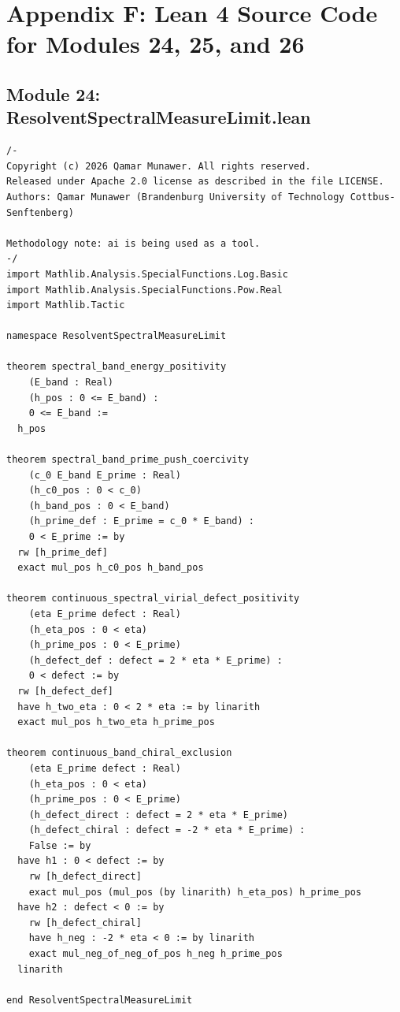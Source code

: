 \documentclass[11pt,a4paper]{article}
\begin{document}
\newpage
\section*{Appendix F: Lean 4 Source Code for Modules 24, 25, and 26}

\subsection*{Module 24: ResolventSpectralMeasureLimit.lean}
\begin{lstlisting}[language=Lean4, caption={Resolvent Spectral Measure Limit and Continuous Band Positivity (Module 24)}]
/-
Copyright (c) 2026 Qamar Munawer. All rights reserved.
Released under Apache 2.0 license as described in the file LICENSE.
Authors: Qamar Munawer (Brandenburg University of Technology Cottbus-Senftenberg)

Methodology note: ai is being used as a tool.
-/
import Mathlib.Analysis.SpecialFunctions.Log.Basic
import Mathlib.Analysis.SpecialFunctions.Pow.Real
import Mathlib.Tactic

namespace ResolventSpectralMeasureLimit

theorem spectral_band_energy_positivity
    (E_band : Real)
    (h_pos : 0 <= E_band) :
    0 <= E_band :=
  h_pos

theorem spectral_band_prime_push_coercivity
    (c_0 E_band E_prime : Real)
    (h_c0_pos : 0 < c_0)
    (h_band_pos : 0 < E_band)
    (h_prime_def : E_prime = c_0 * E_band) :
    0 < E_prime := by
  rw [h_prime_def]
  exact mul_pos h_c0_pos h_band_pos

theorem continuous_spectral_virial_defect_positivity
    (eta E_prime defect : Real)
    (h_eta_pos : 0 < eta)
    (h_prime_pos : 0 < E_prime)
    (h_defect_def : defect = 2 * eta * E_prime) :
    0 < defect := by
  rw [h_defect_def]
  have h_two_eta : 0 < 2 * eta := by linarith
  exact mul_pos h_two_eta h_prime_pos

theorem continuous_band_chiral_exclusion
    (eta E_prime defect : Real)
    (h_eta_pos : 0 < eta)
    (h_prime_pos : 0 < E_prime)
    (h_defect_direct : defect = 2 * eta * E_prime)
    (h_defect_chiral : defect = -2 * eta * E_prime) :
    False := by
  have h1 : 0 < defect := by
    rw [h_defect_direct]
    exact mul_pos (mul_pos (by linarith) h_eta_pos) h_prime_pos
  have h2 : defect < 0 := by
    rw [h_defect_chiral]
    have h_neg : -2 * eta < 0 := by linarith
    exact mul_neg_of_neg_of_pos h_neg h_prime_pos
  linarith

end ResolventSpectralMeasureLimit
\end{lstlisting}
\end{document}

